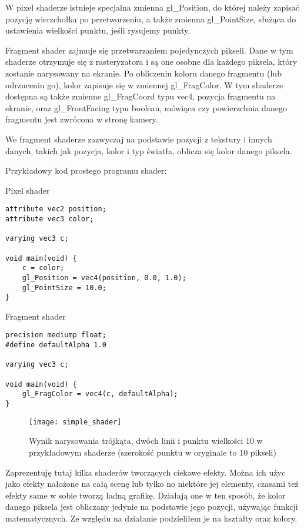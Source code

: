 W pixel shaderze istnieje specjalna zmienna gl\_Position, do której należy zapisać pozycję wierzchołka po przetworzeniu, a także zmienna gl\_PointSize, służąca do ustawienia wielko\'sci punktu, je\'sli rysujemy punkty.\bigskip

\smallskip

Fragment shader zajmuje się przetwarzaniem pojedynczych pikseli. Dane w tym shaderze otrzymuje się z rasteryzatora i są one osobne dla każdego piksela, który zostanie narysowany na ekranie. Po obliczeniu koloru danego fragmentu (lub odrzuceniu go), kolor zapisuje się w zmiennej gl\_FragColor. W tym shaderze dostępna są także zmienne gl\_FragCoord typu vec4, pozycja fragmentu na ekranie, oraz gl\_FrontFacing typu boolean, mówiąca czy powierzchnia danego fragmentu jest zwrócona w stronę kamery.

We fragment shaderze zazwyczaj na podstawie pozycji z tekstury i innych danych, takich jak pozycja, kolor i typ \'swiatła, oblicza się kolor danego piksela.\bigskip

\noindent Przykładowy kod prostego programu shader:\smallskip

{\large Pixel shader}
\begin{lstlisting}
attribute vec2 position;
attribute vec3 color;

varying vec3 c;

void main(void) {
	c = color;
	gl_Position = vec4(position, 0.0, 1.0);
	gl_PointSize = 10.0;
}
\end{lstlisting}\newpage

{\large Fragment shader}
\begin{lstlisting}
precision mediump float;
#define defaultAlpha 1.0

varying vec3 c;

void main(void) {
	gl_FragColor = vec4(c, defaultAlpha);
}
\end{lstlisting}
\begin{figure}[h]
	\centering
	\noindent\texttt{[image: simple\_shader]}
	\caption{Wynik narysowania trójkąta, dwóch linii i punktu wielko\'sci 10 w przykładowym shaderze (szeroko\'sć punktu w oryginale to 10 pikseli)}
\end{figure}\vfill

\newpage{}

Zaprezentuję tutaj kilka shaderów tworzących ciekawe efekty. Można ich użyc jako efekty nałożone na całą scenę lub tylko no niektóre jej elementy, czasami też efekty same w sobie tworzą ładną grafikę.
Działają one w ten sposób, że kolor danego piksela jest obliczany jedynie na podstawie jego pozycji, używając funkcji matematycznych. Ze względu na działanie podzieliłem je na kształty oraz kolory.

